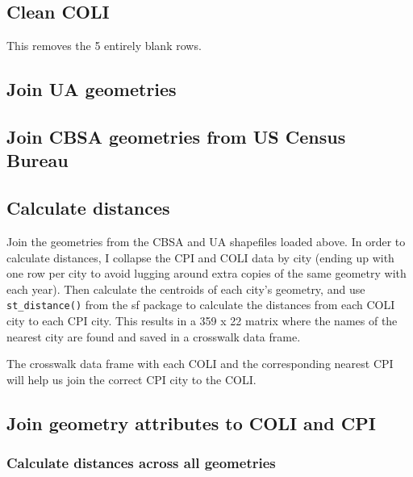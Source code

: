\documentclass[]{article}
\begin{document}
\hypertarget{clean-coli}{%
\subsection{Clean COLI}\label{clean-coli}}

This removes the 5 entirely blank rows.

\hypertarget{join-ua-geometries}{%
\subsection{Join UA geometries}\label{join-ua-geometries}}

\hypertarget{join-cbsa-geometries-from-us-census-bureau}{%
\subsection{Join CBSA geometries from US Census
Bureau}\label{join-cbsa-geometries-from-us-census-bureau}}

\hypertarget{calculate-distances}{%
\subsection{Calculate distances}\label{calculate-distances}}

Join the geometries from the CBSA and UA shapefiles loaded above. In
order to calculate distances, I collapse the CPI and COLI data by city
(ending up with one row per city to avoid lugging around extra copies of
the same geometry with each year). Then calculate the centroids of each
city's geometry, and use \texttt{st\_distance()} from the sf package to
calculate the distances from each COLI city to each CPI city. This
results in a 359 x 22 matrix where the names of the nearest city are
found and saved in a crosswalk data frame.

The crosswalk data frame with each COLI and the corresponding nearest
CPI will help us join the correct CPI city to the COLI.

\hypertarget{join-geometry-attributes-to-coli-and-cpi}{%
\subsection{Join geometry attributes to COLI and
CPI}\label{join-geometry-attributes-to-coli-and-cpi}}

\hypertarget{calculate-distances-across-all-geometries}{%
\subsubsection{Calculate distances across all
geometries}\label{calculate-distances-across-all-geometries}}
\end{document}

